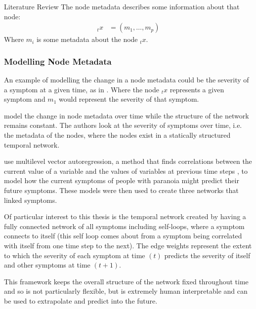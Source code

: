 \documentclass[12pt]{amsbook}
\begin{document}
\begin{chapter}{Literature Review}
            The node metadata describes some information about that node:
            \begin{align}
                _t x &= (m_1,\ldots, m_p)
            \end{align}
            Where $m_i$ is some metadata about the node $_t x$.

        \subsubsection{Modelling Node Metadata}
            An example of modelling the change in a node metadata could be the severity of a symptom at a given time, as in \cite{contreras2020temporal}. Where the node $_t x$ represents a given symptom and $m_1$ would represent the severity of that symptom. 


            \cite{contreras2020temporal} model the change in node metadata over time while the structure of the network remains constant. The authors look at the severity of symptoms over time, i.e. the metadata of the nodes, where the nodes exist in a statically structured temporal network. 
            
             use multilevel vector autoregression, a method that finds correlations between the current value of a variable and the values of variables at previous time steps \cite{singer2003applied}, to model how the current symptoms of people with paranoia might predict their future symptoms. These models were then used to create three networks that linked symptoms. 
            
            Of particular interest to this thesis is the temporal network created by having a fully connected network of all symptoms including self-loops, where a symptom connects to itself (this self loop comes about from a symptom being correlated with itself from one time step to the next). The edge weights represent the extent to which the severity of each symptom at time $(t)$ predicts the severity of itself and other symptoms at time $(t+1)$. 
            
            This framework keeps the overall structure of the network fixed throughout time and so is not particularly flexible, but is extremely human interpretable and can be used to extrapolate and predict into the future. 


\end{chapter}
\end{document}
